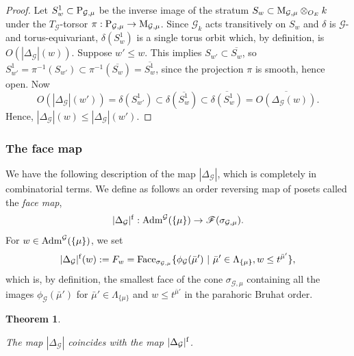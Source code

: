 \documentclass[reqno, 10pt]{amsart}
\makeatletter
\newcommand{\CG}{\ensuremath{\mathcal {G}}\xspace}
\newcommand{\ov}{\overline}
\newtheorem{theorem}[subsubsection]{Theorem}
\theoremstyle{definition}
\numberwithin{equation}{subsection}
\numberwithin{subsubsection}{subsection}
\renewcommand{\to}{%
   \ifbool{@display}{\longrightarrow}{\rightarrow}%
   }
\newcommand{\Adm}{{\rm {Adm}}}
\newcommand{\Mloc}{{\rm M}}
\makeatother
\begin{document}
\begin{proof}
Let $S^1_w\subset {\rm P}_{\CG,\mu}$ be the inverse image of the stratum $S_w\subset \Mloc_{\CG,\mu}\otimes_{O_E}k$
under the $T_\CG$-torsor $\pi: {\rm P}_{\CG,\mu}\to \Mloc_{\CG,\mu}$. Since $\CG_k$ acts transitively on $S_w$ and $\delta$ is $\CG$- and torus-equivariant, $\delta(S^1_w)$ is a single torus orbit which, by definition, is $O(|\Delta_\CG|(w))$.
Suppose $w'\leq w$. This implies $S_{w'}\subset \ov{S_w}$, so $S^1_{w'}=\pi^{-1}(S_{w'})\subset \pi^{-1}(\ov{S_w})=\ov{S^1_w}$, since the projection $\pi$ is smooth, hence open. Now
\[
O(|\Delta_\CG |(w'))=\delta(S^1_{w'})\subset \delta(\ov {S^1_{w}})\subset \ov{\delta(S^1_{w})}=\ov{O(\Delta_\CG(w))}.
\]
Hence, $|\Delta_\CG |(w)\leq |\Delta_\CG|(w')$.
 \end{proof}
 
 

 \subsubsection{The face map}

We have the following description of the map $|\Delta_\CG |$, which is completely in combinatorial terms.  We define as follows an order reversing map of posets called the \emph{face map},
\begin{equation}
|\Delta_\CG|^{\rm f}: {\rm Adm}^\CG(\{\mu\})\to {\mathscr F}(\sigma_{\CG,\mu}).
\end{equation}
For $w\in\Adm^\CG(\{\mu\})$, we set  
\[
|\Delta_\CG|^{\rm f}(w):=F_w={\rm Face}_{\sigma_{\CG,\mu}}\{\phi_\CG(\bar\mu')\ |\ \bar\mu'\in \Lambda_{\{\mu\}}, w\leq t^{\bar\mu'}\} ,
\]
which is, by definition, the smallest face of the cone $\sigma_{\CG,\mu}$ containing all the images $\phi_\CG(\bar\mu')$ for   $\bar\mu'\in \Lambda_{\{\mu\}}$ and $w\leq t^{\bar\mu'}$ in the parahoric Bruhat order.

\begin{theorem}\label{conj:fac}
 
  The map $|\Delta_\CG |$ coincides with the map $|\Delta_\CG |^{\rm f}$.
 
 
\end{theorem}
\end{document}
